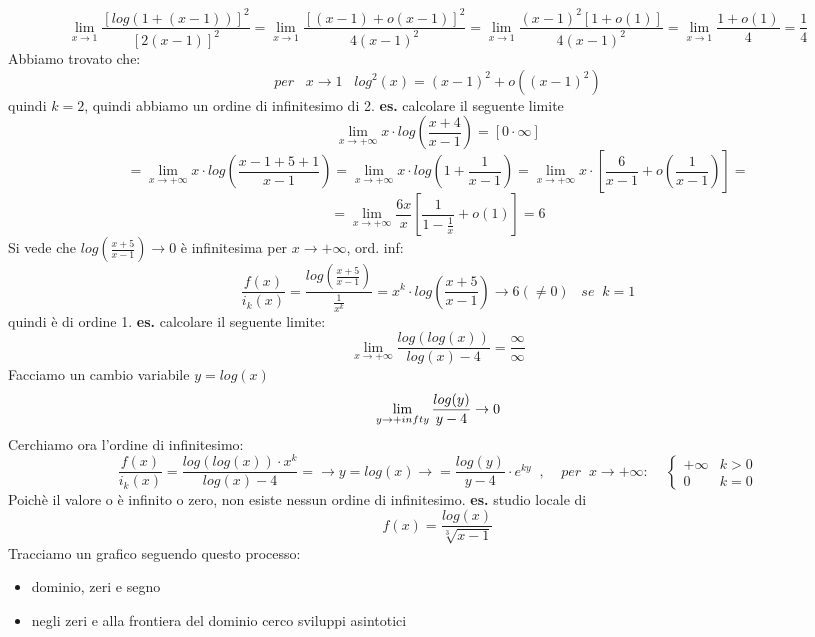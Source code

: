 \[
    \lim_{x\rightarrow 1} \frac{[log(1+(x-1)) ]^2}{[2(x-1)]^2} = \lim_{x\rightarrow 1} \frac{[(x-1) + o(x-1)]^2}{4(x-1)^2} = \lim_{x\rightarrow 1} \frac{(x-1)^2 [1+o(1)]}{4(x-1)^2} = \lim_{x\rightarrow 1} \frac{ 1+o(1)}{4} = \frac{1}{4}
\]
Abbiamo trovato che:
\[
    per \;\;\;x \rightarrow  1 \;\;\; log^2(x) = (x-1)^2 + o((x-1)^2)
\]
quindi $k=2$, quindi abbiamo un ordine di infinitesimo di 2.
\newline
\newline
\newline
\textbf{es.}  calcolare il seguente limite
\[
    \lim_{x\rightarrow +\infty} x \cdot log(\frac{x+4}{x-1}) = [0 \cdot \infty]
\]
\[
    = \lim_{x\rightarrow +\infty} x \cdot  log(\frac{x-1 + 5+1}{x-1}) = \lim_{x\rightarrow +\infty} x \cdot log(1 + \frac{1}{x-1}) = \lim_{x\rightarrow +\infty} x \cdot [\frac{6}{x-1} + o(\frac{1}{x-1})] = 
\]
\[
    = \lim_{x\rightarrow +\infty} \frac{6x}{x}[\frac{1}{1-\frac{1}{x}}+ o(1)] = 6
\]
Si vede che $log(\frac{x+5}{x-1}) \rightarrow 0$ è infinitesima per $x \rightarrow  + \infty$,
\newline
ord. inf:
\[
    \frac{f(x)}{i_k(x)} = \frac{log(\frac{x+5}{x-1})}{\frac{1}{x^k}} = x^k \cdot log(\frac{x+5}{x-1}) \rightarrow 6 ( \neq 0) \;\;\; se \;\; k = 1
\]
quindi è di ordine 1.
\newline
\newline
\newline
\textbf{es.} calcolare il seguente limite:
\[
    \lim_{x\rightarrow +\infty} \frac{log(log(x))}{log(x)-4} = \frac{\infty}{\infty}
\]
Facciamo un cambio variabile $y = log(x)$
\[
    \lim_{y\rightarrow +\\infty} \frac{log(y)}{y-4} \rightarrow 0
\]
Cerchiamo ora l'ordine di infinitesimo:
\[
    \frac{f(x)}{i_k(x)} = \frac{log(log(x)) \cdot x^k }{log(x)-4} = \rightarrow y= log(x) \rightarrow =  \frac{log(y)}{y-4} \cdot e^{ky} \;\; , \;\;\;\;per \;\;x \rightarrow  + \infty : \;\;\;\; \begin{cases}
        +\infty & k>0 \\
        0 & k=0
    \end{cases}
\]
Poichè il valore o è infinito o zero, non esiste nessun ordine di infinitesimo.
\newline
\newline
\newline
\textbf{es.} studio locale di
\[
    f(x) = \frac{log(x)}{\sqrt[3]{x-1}}
\]
Tracciamo un grafico seguendo questo processo:
\begin{itemize}
    \item dominio, zeri e segno
    \item negli zeri e alla frontiera del dominio cerco sviluppi asintotici
\end{itemize}
